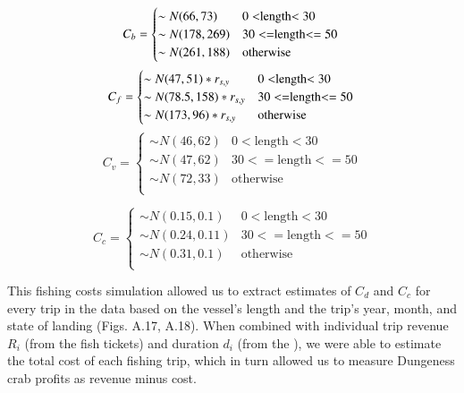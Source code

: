 \documentclass[]{elsarticle} %
\begin{document}
\begin{equation}
  C_b =
    \begin{cases}
      \sim N(66,73) & \text{$0<$length$<30$}\\
      \sim N(178,269) & \text{$30<=$length$<=50$}\\
      \sim N(261,188) & \text{otherwise}\\
    \end{cases}\\
\end{equation} \begin{equation}
  C_f =
    \begin{cases}
      \sim N(47,51)*r_{s,y} & \text{$0<$length$<30$}\\
      \sim N(78.5,158)*r_{s,y} & \text{$30<=$length$<=50$}\\
      \sim N(173,96)*r_{s,y} & \text{otherwise}\\
    \end{cases}\\
\end{equation} \begin{equation}
  C_v =
    \begin{cases}
      \sim N(46,62) & \text{$0<$length$<30$}\\
      \sim N(47,62) & \text{$30<=$length$<=50$}\\
      \sim N(72,33) & \text{otherwise}\\
    \end{cases}
\end{equation}

\begin{equation}
  C_c = 
  \begin{cases}
      \sim N(0.15,0.1) & \text{$0<$length$<30$}\\
      \sim N(0.24,0.11) & \text{$30<=$length$<=50$}\\
      \sim N(0.31,0.1) & \text{otherwise}\\
  \end{cases}
\end{equation}

This fishing costs simulation allowed us to extract estimates of \(C_d\)
and \(C_c\) for every trip in the data based on the vessel's length and
the trip's year, month, and state of landing (Figs. A.17, A.18). When
combined with individual trip revenue \(R_i\) (from the fish tickets)
and duration \(d_i\) (from the ), we were able to estimate the total
cost of each fishing trip, which in turn allowed us to measure Dungeness
crab profits as revenue minus cost.
\end{document}
